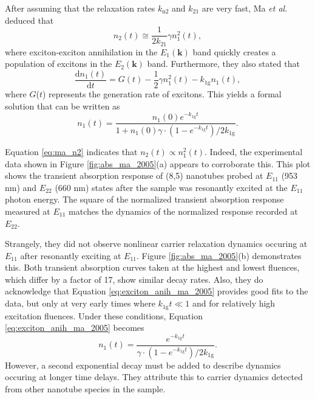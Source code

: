 After assuming that the relaxation rates $k_\text{n2}$ and $k_\text{21}$ are very fast, Ma \textit{et al}. deduced that
\begin{equation}
	n_2(t) \cong \frac{1}{2 k_{21}} \gamma n^2_1(t),
	\label{eq:ma_n2}
\end{equation}
where exciton-exciton annihilation in the $E_1(\mathbf{k})$ band quickly creates a population of excitons in the $E_2(\mathbf{k})$ band. Furthermore, they also stated that
\begin{equation}
\frac{\mathrm{d} n_1(t)}{\mathrm{d}t} = G(t) - \frac{1}{2}\gamma n_1^2(t) - k_\text{1g} n_1(t),
\end{equation}
where $G$($t$) represents the generation rate of excitons. This yields a formal solution that can be written as
%
\begin{equation}
	n_1(t) = \frac{n_1(0)e^{-k_\text{1g}t}}{1 + n_1(0) \gamma\cdot(1 - e^{-k_\text{1g}t} )/2k_\text{1g}}.
	\label{eq:exciton_anih_ma_2005}
\end{equation}
%

Equation \eqref{eq:ma_n2} indicates that $n_2(t) \propto n_1^2(t)$. Indeed, the experimental data shown in Figure \ref{fig:abs_ma_2005}(a) appears to corroborate this. This plot shows the transient absorption response of (8,5) nanotubes probed at $E_{11}$ (953 nm) and $E_{22}$ (660 nm) states after the sample was resonantly excited at the $E_{11}$ photon energy. The square of the normalized transient absorption response measured at $E_{11}$ matches the dynamics of the normalized response recorded at $E_{22}$.

Strangely, they did not observe nonlinear carrier relaxation dynamics occuring at $E_{11}$ after resonantly exciting at $E_{11}$. Figure \ref{fig:abs_ma_2005}(b) demonstrates this. Both transient absorption curves taken at the highest and lowest fluences, which differ by a factor of 17, show similar decay rates. Also, they do acknowledge that Equation \eqref{eq:exciton_anih_ma_2005} provides good fits to the data, but only at very early times where $k_\text{1g} t \ll 1$ and for relatively high excitation fluences. Under these conditions, Equation \eqref{eq:exciton_anih_ma_2005} becomes
\begin{equation}
		n_1(t) = \frac{e^{-k_\text{1g}t}}{\gamma\cdot(1 - e^{-k_\text{1g}t} )/2k_\text{1g}}.
\end{equation}
However, a second exponential decay must be added to describe dynamics occuring at longer time delays. They attribute this to carrier dynamics detected from other nanotube species in the sample.

